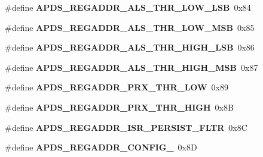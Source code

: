 \begin{DoxyCompactItemize}
\mbox{\label{group__APDS9960__FunctionDefines_ga720025eb26ed18a7ca7567c29a343037}} 
\#define {\bfseries A\+P\+D\+S\+\_\+\+R\+E\+G\+A\+D\+D\+R\+\_\+\+A\+L\+S\+\_\+\+T\+H\+R\+\_\+\+L\+O\+W\+\_\+\+L\+SB}~0x84
\item 
\mbox{\label{group__APDS9960__FunctionDefines_ga3168be2ab13e4902d8773275b07655c6}} 
\#define {\bfseries A\+P\+D\+S\+\_\+\+R\+E\+G\+A\+D\+D\+R\+\_\+\+A\+L\+S\+\_\+\+T\+H\+R\+\_\+\+L\+O\+W\+\_\+\+M\+SB}~0x85
\item 
\mbox{\label{group__APDS9960__FunctionDefines_gab0fcbf8984c44006137ebf71e8839b4c}} 
\#define {\bfseries A\+P\+D\+S\+\_\+\+R\+E\+G\+A\+D\+D\+R\+\_\+\+A\+L\+S\+\_\+\+T\+H\+R\+\_\+\+H\+I\+G\+H\+\_\+\+L\+SB}~0x86
\item 
\mbox{\label{group__APDS9960__FunctionDefines_ga5a5ad87e685872967cbc09d489497ee5}} 
\#define {\bfseries A\+P\+D\+S\+\_\+\+R\+E\+G\+A\+D\+D\+R\+\_\+\+A\+L\+S\+\_\+\+T\+H\+R\+\_\+\+H\+I\+G\+H\+\_\+\+M\+SB}~0x87
\item 
\mbox{\label{group__APDS9960__FunctionDefines_ga3ef3b57824bbf0b8c82b3fe4d2b5beb5}} 
\#define {\bfseries A\+P\+D\+S\+\_\+\+R\+E\+G\+A\+D\+D\+R\+\_\+\+P\+R\+X\+\_\+\+T\+H\+R\+\_\+\+L\+OW}~0x89
\item 
\mbox{\label{group__APDS9960__FunctionDefines_ga84ee32f4070b1257850cb70ebaf1c320}} 
\#define {\bfseries A\+P\+D\+S\+\_\+\+R\+E\+G\+A\+D\+D\+R\+\_\+\+P\+R\+X\+\_\+\+T\+H\+R\+\_\+\+H\+I\+GH}~0x8B
\item 
\mbox{\label{group__APDS9960__FunctionDefines_ga729f7126b7625354a3b77de96e1ddaf7}} 
\#define {\bfseries A\+P\+D\+S\+\_\+\+R\+E\+G\+A\+D\+D\+R\+\_\+\+I\+S\+R\+\_\+\+P\+E\+R\+S\+I\+S\+T\+\_\+\+F\+L\+TR}~0x8C
\item 
\mbox{\label{group__APDS9960__FunctionDefines_gaac84f407f1846f71705ab34320e7662f}} 
\#define {\bfseries A\+P\+D\+S\+\_\+\+R\+E\+G\+A\+D\+D\+R\+\_\+\+C\+O\+N\+F\+I\+G\+\_}~0x8D
\item 

\end{DoxyCompactItemize}
